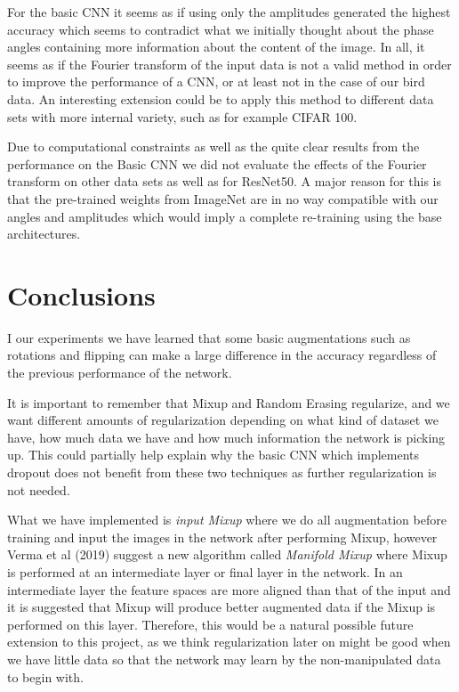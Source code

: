 \documentclass{article}
\begin{document}
For the basic CNN it seems as if using only the amplitudes generated the highest accuracy which seems to contradict what we initially thought about the phase angles containing more information about the content of the image. In all, it seems as if the Fourier transform of the input data is not a valid method in order to improve the performance of a CNN, or at least not in the case of our bird data. An interesting extension could be to apply this method to different data sets with more internal variety, such as for example CIFAR 100.

\medskip

Due to computational constraints as well as the quite clear results from the performance on the Basic CNN we 
did not evaluate the effects of the Fourier transform on other data sets as well as for ResNet50. 
A major reason for this is that the pre-trained weights from ImageNet are in no way 
compatible with our angles and amplitudes which would imply a complete re-training using the base architectures.

\section{Conclusions}

I our experiments we have learned that some basic augmentations such as rotations and flipping can make a large difference in the accuracy regardless of the previous performance of the network.

It is important to remember that Mixup and Random Erasing regularize, and we want different amounts of regularization depending on what kind of dataset we have, how much data we have and how much information the network is picking up. This could partially help explain why the basic CNN which implements dropout does not benefit from these two techniques as further regularization is not needed.

What we have implemented is \textit{input Mixup} where we do all augmentation before training and input the images in the network after performing Mixup, however Verma et al (2019) 
suggest a new algorithm called \textit{Manifold Mixup} where Mixup is performed at an intermediate layer or final layer in the network. In an intermediate layer 
the feature spaces are more aligned than that of the input and it is suggested that Mixup will produce better augmented data if the Mixup is performed on this layer. Therefore, this would be 
a natural possible future extension to this project, as we think regularization later on might be good when we have little data so that the network may learn by the non-manipulated data to begin with. 
\end{document}
